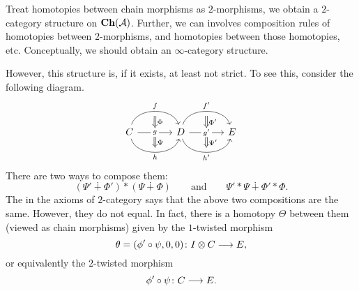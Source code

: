 {Treat homotopies between chain morphisms as $2$-morphisms, 
we obtain a $2$-category structure on $\mathbf{Ch}({\cal A})$. 
Further, we can involves composition rules of 
homotopies between $2$-morphisms, and 
homotopies between those homotopies, etc. 
Conceptually, we should obtain an $\infty$-category structure.

However, this structure is, if it exists, at least not strict. 
To see this, consider the following diagram.
\[
\begin{tikzcd}[column sep=large, row sep=large]
{C}
\ar[r,bend left=75,"{f}",""{name=a,below}]
\ar[r,,"{g}"description,""{name=b},""{name={a'},below}]
\ar[r,bend right=75,"{h}"',""{name={b'}}]
\ar[Rightarrow,from=a,to=b,"{\Phi}"]
\ar[Rightarrow,from={a'},to={b'},"{\Psi}"]&
{D}
\ar[r,bend left=75,"{f'}",""{name=a,below}]
\ar[r,,"{g'}"description,""{name=b},""{name={a'},below}]
\ar[r,bend right=75,"{h'}"',""{name={b'}}]
\ar[Rightarrow,from=a,to=b,"{\Phi'}"]
\ar[Rightarrow,from={a'},to={b'},"{\Psi'}"]&{E}
\end{tikzcd}
\]
There are two ways to compose them:
\[
(\Psi'\dotplus\Phi')\ast(\Psi\dotplus\Phi)\qquad\text{and}\qquad
\Psi'\ast\Psi\dotplus\Phi'\ast\Phi.
\]
The  in the axioms of $2$-category says
that the above two compositions are the same. 
However, they do not equal. 
In fact, there is a homotopy $\Theta$ between them 
(viewed as chain morphisms) 
given by the $1$-twisted morphism
\[
\theta= (\phi'\circ\psi,0,0)\colon
I\otimes C\longrightarrow E,
\]
or equivalently the $2$-twisted morphism
\[
\phi'\circ\psi \colon C\longrightarrow E.
\]

}


